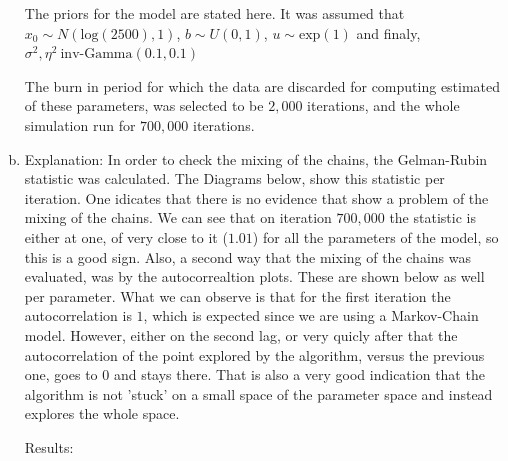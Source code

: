 \documentclass[12pt,a4paper]{article}
\begin{document}
\begin{enumerate}[(a)]
The priors for the model are stated here. It was assumed that $x_0 \sim N(\text{log}(2500),1)$, $b \sim U(0,1)$, $u \sim \text{exp}(1)$ and finaly, $\sigma^2, \eta^2 ~ \text{inv-Gamma}(0.1,0.1)$

The burn in period for which the data are discarded for computing estimated of these parameters, was selected to be $2,000$ iterations, and the whole simulation run for $700,000$ iterations.

\item
Explanation: In order to check the mixing of the chains, the Gelman-Rubin statistic was calculated. The Diagrams below, show this statistic per iteration. One idicates that there is no evidence that show a problem of the mixing of the chains. We can see that on iteration $700,000$ the statistic is either at one, of very close to it ($1.01$) for all the parameters of the model, so this is a good sign. Also, a second way that the mixing of the chains was evaluated, was by the autocorrealtion plots. These are shown below as well per parameter. What we can observe is that for the first iteration the autocorrelation is $1$, which is expected since we are using a Markov-Chain model. However, either on the second lag, or very quicly after that the autocorrelation of the point explored by the algorithm, versus the previous one, goes to $0$ and stays there. That is also a very good indication that the algorithm is not 'stuck' on a small space of the parameter space and instead explores the whole space. 

Results:


\end{enumerate}
\end{document}
